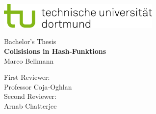\begin{titlepage}
    \vspace*{-2cm}
    \newlength{\links}
    \setlength{\links}{-1.5cm}
    \sffamily
    \hspace*{\links}
    \begin{minipage}{12.5cm}
        \includegraphics[width=8cm]{bilder/tud_logo_rgb}
    \end{minipage}

    \vspace*{4cm}

    \hspace*{\links}
    \hspace*{-0.2cm}
        \large
        \begin{center}
            {\Large Bachelor's Thesis} \\
            \vspace*{0.5cm}
            {\LARGE
            \textbf{Collsisions in Hash-Funktions} \\
            }
            \vspace*{0.5cm}
            Marco Bellmann\\
        \end{center}
    \normalsize
    \vspace*{3.5cm}



    \hspace*{\links}
        \center
        First Reviewer: \\
        Professor Coja-Oghlan \\
        \vspace*{0.5cm}
        Second Reviewer: \\
        Arnab Chatterjee \\

    \vspace*{2.5cm}
    \hspace*{\links}


\end{titlepage}
